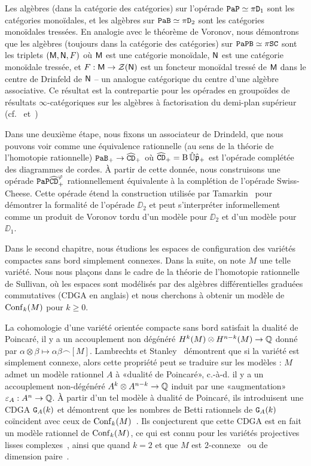 Les algèbres (dans la catégorie des catégories) sur l'opérade $\mathtt{PaP} \simeq \pi \mathtt{D}_{1}$ sont les catégories monoïdales, et les algèbres sur $\mathtt{PaB} \simeq \pi \mathtt{D}_{2}$ sont les catégories monoïdales tressées.
En analogie avec le théorème de Voronov, nous démontrons que les algèbres (toujours dans la catégorie des catégories) sur $\mathtt{PaPB} \simeq \pi \mathtt{SC}$ sont les triplets $(\mathsf{M}, \mathsf{N}, F)$ où $\mathsf{M}$ est une catégorie monoïdale, $\mathsf{N}$ est une catégorie monoïdale tressée, et $F : \mathsf{M} \to \mathcal{Z}(\mathsf{N})$ est un foncteur monoïdal tressé de $\mathsf{M}$ dans le centre de Drinfeld de $\mathsf{N}$ -- un analogue catégorique du centre d'une algèbre associative.
Ce résultat est la contrepartie pour les opérades en groupoïdes de résultats $\infty$-catégoriques sur les algèbres à factorisation du demi-plan supérieur (cf.~\cite[Proposition 31]{Ginot2015} et~\cite[Example 2.13]{AyalaFrancisTanaka2017})

Dans une deuxième étape, nous fixons un associateur de Drindeld, que nous pouvons voir comme une équivalence rationnelle (au sens de la théorie de l'homotopie rationnelle) $\mathtt{PaB}_{+} \to \widehat{\mathtt{CD}}_{+}$ où $\widehat{\mathtt{CD}}_{+} = \operatorname{B} \hat{\mathbb{U}} \hat{\mathfrak{p}}_{+}$ est l'opérade complétée des diagrammes de cordes.
À partir de cette donnée, nous construisons une opérade $\mathtt{PaP}\widehat{\mathtt{CD}}_{+}^{\varphi}$ rationnellement équivalente  à la complétion de l'opérade Swiss-Cheese.
Cette opérade étend la construction utilisée par Tamarkin~\cite{Tamarkin2003} pour démontrer la formalité de l'opérade $\DD_{2}$ et peut s'interpréter informellement comme un produit de Voronov tordu d'un modèle pour $\DD_{2}$ et d'un modèle pour $\DD_{1}$.


Dans le second chapitre, nous étudions les espaces de configuration des variétés compactes sans bord simplement connexes.
Dans la suite, on note $M$ une telle variété.
Nous nous plaçons dans le cadre de la théorie de l'homotopie rationnelle de Sullivan, où les espaces sont modélisés par des algèbres différentielles graduées commutatives (CDGA en anglais) et nous cherchons à obtenir un modèle de $\operatorname{Conf}_{k}(M)$ pour $k \geq 0$.

La cohomologie d'une variété orientée compacte sans bord satisfait la dualité de Poincaré,  il y a un accouplement non dégénéré $H^{k}(M) \otimes H^{n-k}(M) \to \mathbb{Q}$ donné par $\alpha \otimes \beta \mapsto \alpha\beta \frown [M]$.
Lambrechts et Stanley~\cite{LambrechtsStanley2008} démontrent que si la variété est simplement connexe, alors cette propriété peut se traduire sur les modèles : $M$ admet un modèle rationnel $A$ à «dualité de Poincaré», c.-à-d. il y a un accouplement non-dégénéré $A^{k} \otimes A^{n - k} \to \mathbb{Q}$ induit par une «augmentation» $\varepsilon_{A} : A^{n} \rightarrow \mathbb{Q}$.
À partir d'un tel modèle à dualité de Poincaré, ils introduisent une CDGA $\mathtt{G}_{A}(k)$ et démontrent que les nombres de Betti rationnels de $\mathtt{G}_{A}(k)$ coïncident avec ceux de $\operatorname{Conf}_{k}(M)$~\cite{LambrechtsStanley2008a}.
Ils conjecturent que cette CDGA est en fait un modèle rationnel de $\operatorname{Conf}_{k}(M)$, ce qui est connu pour les variétés projectives lisses complexes~\cite{Kriz1994}, ainsi que quand $k = 2$ et que $M$ est $2$-connexe~\cite{LambrechtsStanley2004} ou de dimension paire~\cite{CordovaBulens2015}.

